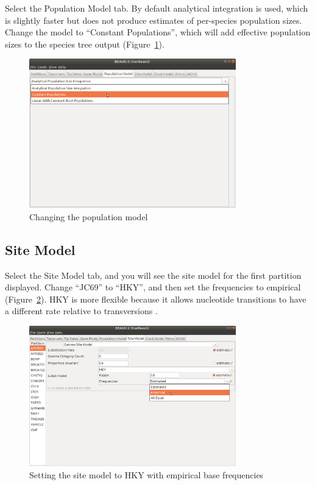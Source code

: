 \documentclass[12pt]{article}
\begin{document}
Select the Population Model tab. By default analytical integration is used,
which is slightly faster but does not produce estimates of per-species population sizes.
Change the model to ``Constant Populations'', which will add effective population
sizes to the species tree output (Figure~\ref{fig:constantPopulations}).

\begin{figure}[htb!]
\centering
\includegraphics[width=0.8\textwidth]{figures/constantPopulations.png}
\caption
{Changing the population model}
\label{fig:constantPopulations}
\end{figure}

\clearpage

\subsection{Site Model}
\label{subsec:siteModel}

Select the Site Model tab, and you will see the site model for the first partition
displayed. Change ``JC69'' to ``HKY'', and then set the frequencies to
empirical (Figure~\ref{fig:hky}).
HKY is more flexible because it allows nucleotide transitions to have a different
rate relative to transversions \citep{Hasegawa1985}.

\begin{figure}[htb!]
\centering
\includegraphics[width=0.8\textwidth]{figures/hky.png}
\caption
{Setting the site model to HKY with empirical base frequencies}
\label{fig:hky}
\end{figure}
\end{document}
